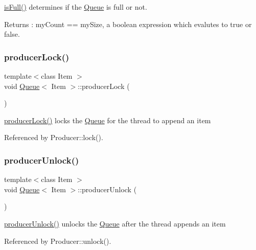 \hyperlink{class_queue_a6d5941cebd6fe01ceefbe7138ff7f048}{is\+Full()} determines if the \hyperlink{class_queue}{Queue} is full or not. \begin{DoxyReturn}{Returns}
\+: my\+Count == my\+Size, a boolean expression which evalutes to true or false. 
\end{DoxyReturn}
\mbox{\label{class_queue_ad2a1705af1b52eb3a8ee18ce3cabb438}} 
\subsubsection{\texorpdfstring{producer\+Lock()}{producerLock()}}
{\footnotesize\ttfamily template$<$class Item $>$ \\
void \hyperlink{class_queue}{Queue}$<$ Item $>$\+::producer\+Lock (\begin{DoxyParamCaption}{ }\end{DoxyParamCaption})}

\hyperlink{class_queue_ad2a1705af1b52eb3a8ee18ce3cabb438}{producer\+Lock()} locks the \hyperlink{class_queue}{Queue} for the thread to append an item 

Referenced by Producer\+::lock().

\mbox{\label{class_queue_ae4f04194e932f23edfda69a255b8aabc}} 
\subsubsection{\texorpdfstring{producer\+Unlock()}{producerUnlock()}}
{\footnotesize\ttfamily template$<$class Item $>$ \\
void \hyperlink{class_queue}{Queue}$<$ Item $>$\+::producer\+Unlock (\begin{DoxyParamCaption}{ }\end{DoxyParamCaption})}

\hyperlink{class_queue_ae4f04194e932f23edfda69a255b8aabc}{producer\+Unlock()} unlocks the \hyperlink{class_queue}{Queue} after the thread appends an item 

Referenced by Producer\+::unlock().

\mbox{\label{class_queue_a5ebe3e112ee1abf233f113ed41e4df29}} 
